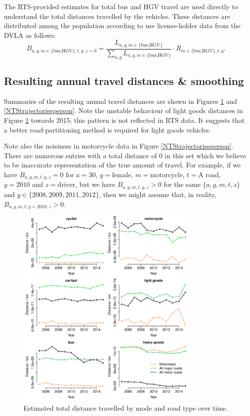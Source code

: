 \documentclass{article}
\begin{document}
The RTS-provided estimates for total bus and HGV travel are used directly to understand the total distances travelled by the vehicles. These distances are distributed among the population according to use license-holder data from the DVLA as follows:
\begin{equation}
B_{a,g,m\in\{\text{bus,HGV}\},t,y,z=0}  = \frac{L_{a,g,m\in\{\text{bus,HGV}\}}}{\sum_{a,g}L_{a,g,m\in\{\text{bus,HGV}\}}}\cdot R_{m\in\{\text{bus,HGV}\},t,y}.
\end{equation}

\subsection{Resulting annual travel distances \& smoothing}

Summaries of the resulting annual travel distances are shown in Figures \ref{NTStrajectories} and \ref{NTStrajectoriesperson}. Note the unstable behaviour of light goods distances in Figure \ref{NTStrajectories} towards 2015; this pattern is not reflected in RTS data. It suggests that a better road-partitioning method is required for light goods vehicles. 

Note also the noisiness in motorcycle data in Figure \ref{NTStrajectoriesperson}. There are numerous entries with a total distance of 0 in this set which we believe to be inaccurate representation of the true amount of travel. For example, if we have $B_{a,g,m,t,y,z}=0$ for $a=30$, $g=\text{female}$, $m=\text{motorcycle}$, $t=\text{A road}$, $y=2010$ and $z=\text{driver}$, but we have $B_{a,g,m,t,y,z}>0$ for the same $\{a,g,m,t,z\}$ and $y\in\{2008,2009,2011,2012\}$, then we might assume that, in reality, $B_{a,g,m,t,y=2010,z}>0$.

\begin{figure}[H]
\centering
\includegraphics[width=0.8\textwidth]{NTStrajectories.pdf}
\caption{\small Estimated total distance travelled by mode and road type over time.}
\label{NTStrajectories}
\end{figure}
\end{document}

